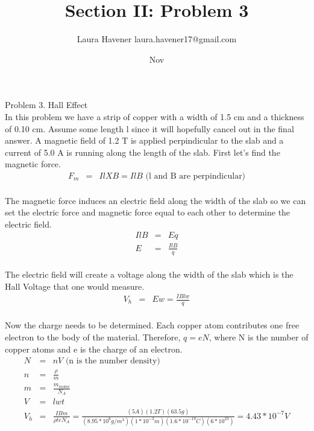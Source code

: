 \documentclass[11pt]{amsart}
\title{Section II: Problem 3}
\author{Laura Havener laura.havener17@gmail.com}
\date{Nov } %
\begin{document}
\maketitle

Problem 3. Hall Effect \\
In this problem we have a strip of copper with a width of 1.5 cm and a thickness of 0.10 cm. Assume some length l since it will hopefully cancel out in the final answer. A magnetic field of 1.2 T is applied perpindicular to the slab and a current of 5.0 A is running along the length of the slab. First let's find the magnetic force. \\
\begin{eqnarray*}
F_{m} &=& IlXB = IlB \mbox{ (l and B are perpindicular)} 
\end{eqnarray*} \\
The magnetic force induces an electric field along the width of the slab so we can set the electric force and magnetic force equal to each other to determine the electric field. \\
\begin{eqnarray*}
IlB &=& Eq \\
E &=& \frac{IlB}{q} 
\end{eqnarray*} \\
The electric field will create a voltage along the width of the slab which is the Hall Voltage that one would measure. \\
\begin{eqnarray*}
V_{h} &=& Ew = \frac{IBlw}{q} 
\end{eqnarray*} \\
Now the charge needs to be determined. Each copper atom contributes one free electron to the body of the material. Therefore, $q=eN$, where N is the number of copper atoms and e is the charge of an electron. \\
\begin{eqnarray*}
N &=& nV \mbox{ (n is the number density)} \\
n &=& \frac{\rho}{m} \\
m &=& \frac{m_{molar}}{N_{A}} \\
V &=& lwt \\
V_{h} &=& \frac{IBm}{\rho{}teN_{A}} = \frac{(5A)(1.2T)(63.5g)}{(8.95*10^{6}g/m^{3})(1*10^{-3}m)(1.6*10^{-19}C)(6*10^{23})} = 4.43*10^{-7} V 
\end{eqnarray*} 
\end{document}
